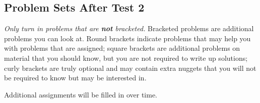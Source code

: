 \documentclass{scrartcl}\usepackage[]{graphicx}\usepackage[]{color}
\begin{document}
\pagestyle{fancy}

\chead{}
\rhead{\thepage/\pageref{end}}
\lfoot{}
\rfoot{}

\begin{center}
  \large
%
%
\subsection*{Problem Sets After Test 2}

\end{center}


\textit{Only turn in problems that are \textbf{not} bracketed.}
Bracketed problems are additional problems you can look at.
Round brackets indicate problems that may help you with problems that
are assigned; square brackets are additional problems on material
that you should know, but you are not required to write up solutions;
curly brackets are truly optional and may contain extra nuggets that you
will not be required to know but may be interested in.

Additional assignments will be filled in over time.

\bigskip
\end{document}
